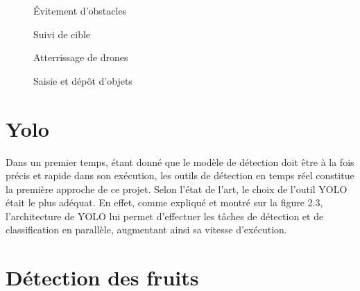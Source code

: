 \documentclass[a4paper,12pt]{report}
\begin{document}
\begin{figure}[h]
\centering
	\begin{minipage}{0.49\textwidth}
\caption{Évitement d’obstacles}
\label{fig:my_label}
	\end{minipage}
	\begin{minipage}{0.49\textwidth}
		\caption{Suivi de cible}
		\label{fig:my_label}
	\end{minipage}
\end{figure}
\begin{figure}[h]
	\begin{minipage}{0.49\textwidth}
		\caption{Atterrissage de drones}
		\label{fig:my_label}
	\end{minipage}
	\begin{minipage}{0.49\textwidth}
	\caption{Saisie et dépôt d’objets }
	\label{fig:my_label}
\end{minipage}
\end{figure}
\newpage
\section{Yolo}
Dans un premier temps, étant donné que le modèle de détection doit être à la fois précis et rapide dans son exécution, les outils de détection en temps réel constitue la première approche de ce projet. Selon l’état de l’art, le choix de l’outil YOLO était le plus adéquat. En effet, comme expliqué et montré sur la figure 2.3, l’architecture de YOLO lui permet d’effectuer les tâches de détection et de classification en parallèle, augmentant ainsi sa vitesse d’exécution.
\section{Détection des fruits}
\end{document}
